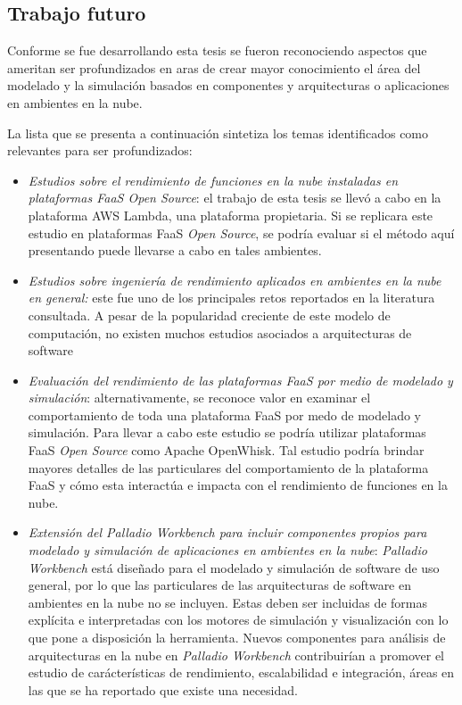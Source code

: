 \subsection{Trabajo futuro}
Conforme se fue desarrollando esta tesis se fueron reconociendo aspectos que ameritan ser profundizados en aras de crear mayor conocimiento el área del modelado y la simulación basados en componentes y arquitecturas o aplicaciones en ambientes en la nube.

La lista que se presenta a continuación sintetiza los temas identificados como relevantes para ser profundizados:
\begin{itemize}
    \item \emph{Estudios sobre el rendimiento de funciones en la nube instaladas en plataformas FaaS \emph{Open Source}}: el trabajo de esta tesis se llevó a cabo en la plataforma AWS Lambda, una plataforma propietaria. Si se replicara este estudio en plataformas FaaS \emph{Open Source}, se podría evaluar si el método aquí presentando puede llevarse a cabo en tales ambientes.
    \item \emph{Estudios sobre ingeniería de rendimiento aplicados en ambientes en la nube en general:} este fue uno de los principales retos reportados en la literatura consultada. A pesar de la popularidad creciente de este modelo de computación, no existen muchos estudios asociados a arquitecturas de software 
    \item \emph{Evaluación del rendimiento de las plataformas FaaS por medio de modelado y simulación}: alternativamente, se reconoce valor en examinar el comportamiento de toda una plataforma FaaS por medo de modelado y simulación. Para llevar a cabo este estudio se podría utilizar plataformas FaaS \emph{Open Source} como Apache OpenWhisk. Tal estudio podría brindar mayores detalles de las particulares del comportamiento de la plataforma FaaS y cómo esta interactúa e impacta con el rendimiento de funciones en la nube.
    \item \emph{Extensión del Palladio Workbench para incluir componentes propios para modelado y simulación de aplicaciones en ambientes en la nube}: \emph{Palladio Workbench} está diseñado para el modelado y simulación de software de uso general, por lo que las particulares de las arquitecturas de software en ambientes en la nube no se incluyen. Estas deben ser incluidas de formas explícita e interpretadas con los motores de simulación y visualización con lo que pone a disposición la herramienta. Nuevos componentes para análisis de arquitecturas en la nube en \emph{Palladio Workbench} contribuirían a promover el estudio de carácterísticas de rendimiento, escalabilidad e integración, áreas en las que se ha reportado que existe una necesidad.

\end{itemize}
